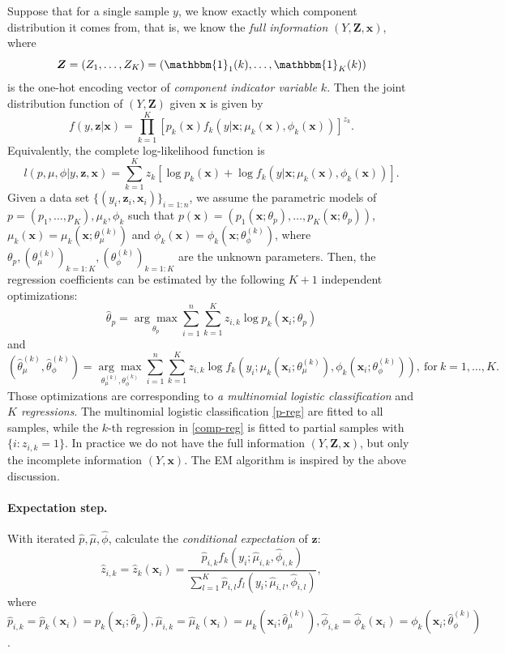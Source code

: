 \documentclass[11pt]{article}
\numberwithin{equation}{section}
\def\bx{\boldsymbol{x}}
\def\bZ{\boldsymbol{Z}}
\def\bz{\boldsymbol{z}}
\begin{document}
	Suppose that for a single sample $y$, we know exactly which component distribution it comes from, that is, we know the \textit{full information} $(Y,\bZ,\bx)$, where
	$$\bZ=(Z_1,\ldots,Z_K)=(\mathbbm{1}_1(k),\ldots,\mathbbm{1}_K(k))$$
	is the one-hot encoding vector of \textit{component indicator variable $k$}.
	Then the joint distribution function of $(Y,\bZ)$ given $\bx$ is given by
	$$f(y,\bz|
	\bx) = \prod_{k=1}^K\left[p_k(\bx)f_k(y|\bx;\mu_k(\bx),\phi_k(\bx))\right]^{z_k}.$$
	Equivalently, the {complete log-likelihood function} is 
	\begin{equation}\label{full-L}
		l(p,\mu,\phi|y,\bz,\bx)=\sum_{k=1}^K z_k\left[\log p_k(\bx) + \log f_k(y|\bx;\mu_k(\bx),\phi_k(\bx))\right].
	\end{equation}
	 Given a data set $\{(y_i,\bz_i,\bx_i)\}_{i=1:n}$, we assume the parametric models of $p=(p_1,\ldots,p_K),\mu_k,\phi_k$ such that $p(\bx)=(p_1(\bx;\theta_p),\ldots,p_K(\bx;\theta_p))$, $\mu_k(\bx)=\mu_k(\bx;\theta_\mu^{(k)})$ and $\phi_k(\bx)=\phi_k(\bx;\theta_\phi^{(k)})$, where $\theta_p, (\theta_\mu^{(k)})_{k=1:K}, (\theta_\phi^{(k)})_{k=1:K}$ are the unknown parameters. Then, the regression coefficients can be estimated by the following $K+1$ {independent optimizations:}
	\begin{equation}\label{p-reg}
		\hat{\theta}_p=\underset{\theta_p}{\arg\max}\sum_{i=1}^n\sum_{k=1}^Kz_{i,k}\log p_k(\bx_i;\theta_p)
	\end{equation}
and
	\begin{equation}\label{comp-reg}
		\left(\hat{\theta}_\mu^{(k)},\hat{\theta}_\phi^{(k)}\right)=\underset{\theta^{(k)}_\mu,\theta^{(k)}_\phi}{\arg\max}\sum_{i=1}^n\sum_{k=1}^Kz_{i,k}\log f_k\left(y_i;\mu_k\left(\bx_i;\theta_\mu^{(k)}\right),\phi_k\left(\bx_i;\theta_\phi^{(k)}\right)\right), ~\text{for} ~ k=1,\ldots,K.
	\end{equation}
	Those optimizations are corresponding to  {\it a multinomial logistic classification} and {\it $K$ regressions}.
The multinomial logistic classification \eqref{p-reg} are fitted to all samples, while the $k$-th regression in \eqref{comp-reg} is fitted to {partial} samples with $\{i:z_{i,k}=1\}$.
In practice we do not have the full information  $(Y,\bZ,\bx)$, but only the incomplete information $(Y,\bx)$. The EM algorithm is inspired by the above discussion.
\paragraph{Expectation step.}
	With iterated $\hat{p},\hat{\mu},\hat{\phi}$, calculate the \textit{conditional expectation} of $\bz$:
	$$\hat{z}_{i,k}=\hat{z}_k(\bx_i)=\frac{\hat{p}_{i,k}f_k(y_i;\hat{\mu}_{i,k},\hat{\phi}_{i,k})}{\sum_{l=1}^K\hat{p}_{i,l}f_l(y_i;\hat{\mu}_{i,l},\hat{\phi}_{i,l})},$$
	where
	$\hat{p}_{i,k}=\hat{p}_k(\bx_i)= p_k(\bx_i;\hat{\theta}_p),\hat{\mu}_{i,k}=\hat{\mu}_k(\bx_i)=\mu_k\left(\bx_i;\hat{\theta}_\mu^{(k)}\right),\hat{\phi}_{i,k}=\hat{\phi}_k(\bx_i)=\phi_k\left(\bx_i;\hat{\theta}_\phi^{(k)}\right)$.
\end{document}
